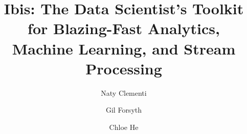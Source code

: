\documentclass[sigconf]{acmart}
\begin{document}
\title{Ibis: The Data Scientist's Toolkit for Blazing-Fast Analytics, Machine Learning, and Stream Processing}

\author{Naty Clementi}

\author{Gil Forsyth}

\author{Chloe He}

\end{document}

